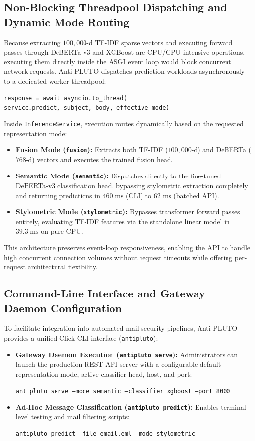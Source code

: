 \documentclass[journal]{IEEEtran}
\begin{document}
\subsection{Non-Blocking Threadpool Dispatching and Dynamic Mode Routing}
Because extracting $100,000$-d TF-IDF sparse vectors and executing forward passes through DeBERTa-v3 and XGBoost are CPU/GPU-intensive operations, executing them directly inside the ASGI event loop would block concurrent network requests. Anti-PLUTO dispatches prediction workloads asynchronously to a dedicated worker threadpool:
\begin{center}
\small
\texttt{response = await asyncio.to\_thread(} \\
\texttt{\quad service.predict, subject, body, effective\_mode)}
\end{center}
Inside \texttt{InferenceService}, execution routes dynamically based on the requested representation mode:
\begin{itemize}
    \item \textbf{Fusion Mode (\texttt{fusion}):} Extracts both TF-IDF ($100,000$-d) and DeBERTa ($768$-d) vectors and executes the trained fusion head.
    \item \textbf{Semantic Mode (\texttt{semantic}):} Dispatches directly to the fine-tuned DeBERTa-v3 classification head, bypassing stylometric extraction completely and returning predictions in $460\text{ ms}$ (CLI) to $62\text{ ms}$ (batched API).
    \item \textbf{Stylometric Mode (\texttt{stylometric}):} Bypasses transformer forward passes entirely, evaluating TF-IDF features via the standalone linear model in $39.3\text{ ms}$ on pure CPU.
\end{itemize}
This architecture preserves event-loop responsiveness, enabling the API to handle high concurrent connection volumes without request timeouts while offering per-request architectural flexibility.

\subsection{Command-Line Interface and Gateway Daemon Configuration}
To facilitate integration into automated mail security pipelines, Anti-PLUTO provides a unified Click CLI interface (\texttt{antipluto}):
\begin{itemize}
    \item \textbf{Gateway Daemon Execution (\texttt{antipluto serve}):} Administrators can launch the production REST API server with a configurable default representation mode, active classifier head, host, and port:
    \begin{center}
    \small
    \texttt{antipluto serve --mode semantic --classifier xgboost --port 8000}
    \end{center}
    \item \textbf{Ad-Hoc Message Classification (\texttt{antipluto predict}):} Enables terminal-level testing and mail filtering scripts:
    \begin{center}
    \small
    \texttt{antipluto predict --file email.eml --mode stylometric}
    \end{center}
\end{itemize}
\end{document}
